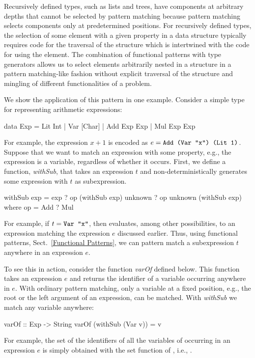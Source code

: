 \noindent
Recursively defined
types, such as lists and trees, have components at arbitrary
depths that cannot be selected by pattern matching because pattern
matching selects components only at predetermined positions.  
For recursively defined types, the
selection of some element with a given property in a
data structure typically requires code for the traversal of the
structure which is intertwined with the code for using the element.  The
combination of functional patterns with type generators
allows us to select elements arbitrarily nested in a
structure in a pattern matching-like fashion without
explicit traversal of the structure and mingling of
different functionalities of a problem.

We show the application of this pattern in one example.
Consider a simple type for representing arithmetic
expressions:
%
\begin{curry}
data Exp = Lit Int
         | Var [Char]
         | Add Exp Exp
         | Mul Exp Exp
\end{curry}
%
For example, the expression $x+1$ is encoded as 
$e = \code{Add (Var "x") (Lit 1)}$.
Suppose that we want to match an expression with 
some property, e.g., the expression is a variable,
regardless of whether it occurs.
First, we define a function, \emph{withSub},
that takes an expression $t$
and non-deterministically generates 
some expression with $t$ as subexpression.
%
\begin{curry}
withSub exp = exp
            ? op (withSub exp) unknown
            ? op unknown (withSub exp)
   where op = Add ? Mul  
\end{curry}
%
For example, if $t = \code{Var "x"}$, then
 evaluates, among other possibilities,
to an expression matching the expression $e$ discussed earlier.
Thus, using functional patterns, Sect.~\ref{Functional Patterns},
we can pattern match a subexpression $t$ anywhere in an expression $e$.

To see this in action, consider the function \emph{varOf} defined below.
This function takes an expression $e$ and returns  the identifier
of a variable occurring anywhere in $e$.  With ordinary pattern matching,
only a variable at a fixed position, e.g., the root or the left
argument of an expression, can be matched.  With \emph{withSub} we
match any variable anywhere:
%
\begin{curry}
varOf :: Exp -> String
varOf (withSub (Var v)) = v  
\end{curry}
%
For example, the set of the identifiers of all the variables of
occurring in an expression $e$ is simply obtained with the set function
of , i.e., 
.

